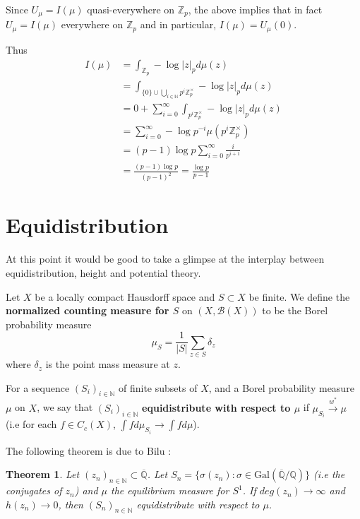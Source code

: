 \documentclass{amsart}
\newtheorem{thm}{Theorem}[section]
\newcommand{\N}{\mathbb{N}}
\newcommand{\Z}{\mathbb{Z}}
\newcommand{\Q}{\mathbb{Q}}
\newcommand{\MCB}{\mathcal{B}}
\newcommand{\ol}{\overline}
\begin{document}
Since $U_{\mu} = I(\mu)$ quasi-everywhere on $\Z_p$, the above implies that in fact $U_{\mu} = I(\mu)$ everywhere on $\Z_p$ and in particular, $I(\mu) = U_{\mu}(0)$.

Thus 
\begin{align*}
I(\mu) 
&= \int_{\Z_p}-\log|z|_pd\mu(z)\\
&= \int_{\{0\}\cup \bigcup\limits_{i \in \N}p^i\Z_p^{\times}}-\log|z|_pd\mu(z)\\
&= 0+ \sum_{i=0}^{\infty} \int_{p^i\Z_p^{\times}}-\log|z|_p d\mu(z)\\
&= \sum_{i=0}^{\infty}-\log p^{-i} \mu(p^i\Z_p^{\times})\\
&= (p-1)\log p \sum_{i=0}^{\infty}\frac{i}{p^{i+1}}\\
&= \frac{(p-1)  \log p}{(p-1)^2} = \frac{\log p}{p-1} 
\end{align*}  

\section{Equidistribution}

At this point it would be good to take a glimpse at the interplay between equidistribution, height and potential theory. 

Let $X$ be a locally compact Hausdorff space and $S \subset X $ be finite. We define the \textbf{normalized counting measure for $S$} on $(X, \MCB(X))$ to be the Borel probability measure $$\mu_S = \frac{1}{|S|}\sum\limits_{z \in S} \delta_z$$ where $\delta_z$ is the point mass measure at $z$. \

For a sequence $(S_i)_{i \in \N}$ of finite subsets of $X$, and a Borel probability measure $\mu$ on $X$, we say that $(S_i)_{i \in \N}$   \textbf{equidistribute with respect to $\mu$} if $\mu_{S_i} \xrightarrow{w^*} \mu$ (i.e for each $f \in C_c(X)$, $\int f d\mu_{S_i} \rightarrow \int f d\mu$).

The following theorem is due to Bilu \cite{Bilu}:

\begin{thm}

Let $(z_n)_{n \in \N} \subset \overline{\Q}$. Let $S_n = \{\sigma(z_n): \sigma \in \mathrm{Gal}(\ol{ \Q }/ \Q )\}$ (i.e the conjugates of $z_n$) and $\mu$ the equilibrium measure for $S^1$. If $deg(z_n) \rightarrow \infty$ and $h(z_n) \rightarrow 0$, then $(S_n)_{n \in \N}$ equidistribute with respect to $\mu$.  

\end{thm}
 
\end{document}
